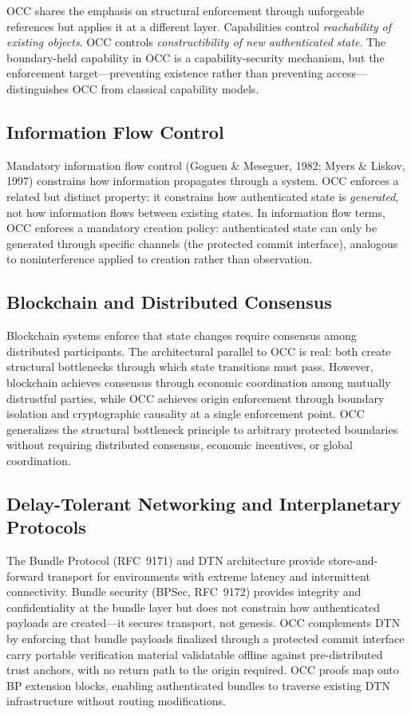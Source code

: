 \documentclass[11pt,letterpaper]{article}
\theoremstyle{occplain}
\theoremstyle{occremark}
\begin{document}
OCC shares the emphasis on structural enforcement through unforgeable references but applies it at a different layer. Capabilities control \emph{reachability of existing objects}. OCC controls \emph{constructibility of new authenticated state}. The boundary-held capability in OCC is a capability-security mechanism, but the enforcement target---preventing existence rather than preventing access---distinguishes OCC from classical capability models.


\subsection{Information Flow Control}
\label{sec:ifc}

Mandatory information flow control (Goguen \& Meseguer, 1982; Myers \& Liskov, 1997) constrains how information propagates through a system. OCC enforces a related but distinct property: it constrains how authenticated state is \emph{generated}, not how information flows between existing states. In information flow terms, OCC enforces a mandatory creation policy: authenticated state can only be generated through specific channels (the protected commit interface), analogous to noninterference applied to creation rather than observation.


\subsection{Blockchain and Distributed Consensus}
\label{sec:blockchain}

Blockchain systems enforce that state changes require consensus among distributed participants. The architectural parallel to OCC is real: both create structural bottlenecks through which state transitions must pass. However, blockchain achieves consensus through economic coordination among mutually distrustful parties, while OCC achieves origin enforcement through boundary isolation and cryptographic causality at a single enforcement point. OCC generalizes the structural bottleneck principle to arbitrary protected boundaries without requiring distributed consensus, economic incentives, or global coordination.


\subsection{Delay-Tolerant Networking and Interplanetary Protocols}
\label{sec:dtn}

The Bundle Protocol (RFC~9171) and DTN architecture provide store-and-forward transport for environments with extreme latency and intermittent connectivity. Bundle security (BPSec, RFC~9172) provides integrity and confidentiality at the bundle layer but does not constrain how authenticated payloads are created---it secures transport, not genesis. OCC complements DTN by enforcing that bundle payloads finalized through a protected commit interface carry portable verification material validatable offline against pre-distributed trust anchors, with no return path to the origin required. OCC proofs map onto BP extension blocks, enabling authenticated bundles to traverse existing DTN infrastructure without routing modifications.
\end{document}
